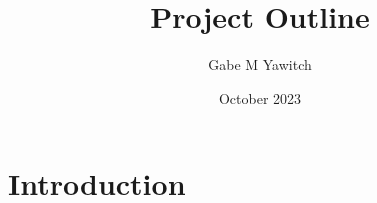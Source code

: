 \documentclass{article}
\title{Project Outline}
\author{Gabe M Yawitch}
\date{October 2023}
\begin{document}
\maketitle

\section{Introduction}
\end{document}
